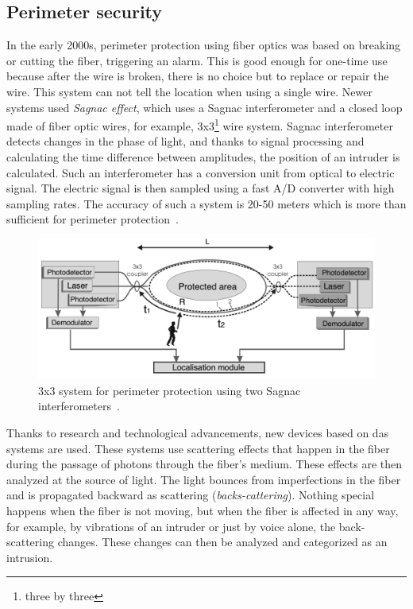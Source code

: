 \subsection{Perimeter security}\label{txt.perimeter.security}

In the early 2000s, perimeter protection using fiber optics was based on breaking or cutting the fiber, triggering an alarm. This is good enough for one-time use because after the wire is broken, there is no choice but to replace or repair the wire. This system can not tell the location when using a single wire. Newer systems used \textit{Sagnac effect}, which uses a Sagnac interferometer and a closed loop made of fiber optic wires, for example, 3x3\footnote{three by three} wire system. Sagnac interferometer detects changes in the phase of light, and thanks to signal processing and calculating the time difference between amplitudes, the position of an intruder is calculated. Such an interferometer has a conversion unit from optical to electric signal. The electric signal is then sampled using a fast A/D converter with high sampling rates. The accuracy of such a system is 20-50 meters which is more than sufficient for perimeter protection~\cite{perimeterpolsko}. 

\begin{figure}
    \centering
    \includegraphics[width=\linewidth]{obrazky/sagnac_interrogator.png}
    \caption{3x3 system for perimeter protection using two Sagnac interferometers~\cite{perimeterpolsko}.}
    \label{fig:sagnac}
\end{figure}

Thanks to research and technological advancements, new devices based on \ac{das} systems are used. These systems use scattering effects that happen in the fiber during the passage of photons through the fiber's medium. These effects are then analyzed at the source of light. The light bounces from imperfections in the fiber and is propagated backward as scattering (\textit{backs-cattering}). Nothing special happens when the fiber is not moving, but when the fiber is affected in any way, for example, by vibrations of an intruder or just by voice alone, the back-scattering changes. These changes can then be analyzed and categorized as an intrusion.


